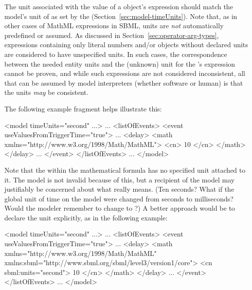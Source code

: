 The unit associated with the value of a \Delay object's
 expression should match the model's unit of
 as set by the \Model {}
(Section~\ref{sec:model-timeUnits}).  Note that, as in other cases
of MathML expressions in SBML, units are \emph{not} automatically
predefined or assumed.  As discussed in
Section~\ref{sec:operator-arg-types}, expressions containing only
literal numbers and/or \Parameter objects without declared units
are considered to have unspecified units.  In such cases, the
correspondence between the needed entity units and the (unknown)
unit for the \Delay's  expression cannot be proven,
and while such expressions are not considered inconsistent, all
that can be assumed by model interpreters (whether software or
human) is that the units \emph{may} be consistent.

The following \Event example fragment helps illustrate this:
\label{sec:event:delay:example}

\begin{example}
<model timeUnits="second" ...>
    ...
    <listOfEvents>
        <event useValuesFromTriggerTime="true">
            ...
            <delay>
                <math xmlns="http://www.w3.org/1998/Math/MathML">
                    <cn> 10 </cn>
                </math>
            </delay>
            ...
        </event>
    </listOfEvents>
    ...
</model>
\end{example}

Note that the  within the mathematical formula
has no specified unit attached to it.  The model is not invalid
because of this, but a recipient of the model may justifiably be
concerned about what  really means.  (Ten seconds?  What
if the global unit of time on the model were changed from seconds
to milliseconds?  Would the modeler remember to change  to
?)  A better approach would be to declare the unit
explicitly, as in the following example:

\begin{example}
<model timeUnits="second" ...>
    ...
    <listOfEvents>
        <event useValuesFromTriggerTime="true">
            ...
            <delay>
                <math xmlns="http://www.w3.org/1998/Math/MathML"
                      xmlns:sbml="http://www.sbml.org/sbml/level3/version1/core">
                    <cn sbml:units="second"> 10 </cn>
                </math>
            </delay>
            ...
        </event>
    </listOfEvents>
    ...
</model>
\end{example}

